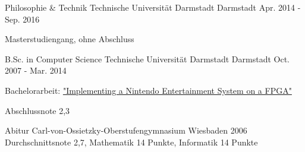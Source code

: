
\begin{cventries}

    \cventry
    {Philosophie \& Technik} %
    {Technische Universität Darmstadt} %
    {Darmstadt} %
    {Apr. 2014 - Sep. 2016} %
    {
      \begin{cvitems} %
        \item {Masterstudiengang, ohne Abschluss}
      \end{cvitems}
    }


  \cventry
    {B.Sc. in Computer Science} %
    {Technische Universität Darmstadt} %
    {Darmstadt} %
    {Oct. 2007 - Mar. 2014} %
    {
      \begin{cvitems} %
        \item {Bachelorarbeit: 
          \href{https://strfry.org/assets/thesis.pdf}
          {"Implementing a Nintendo Entertainment System on a FPGA"}
        }
        \item {Abschlussnote 2,3}
      \end{cvitems}
    }

   \cventry
    {Abitur}
    {Carl-von-Ossietzky-Oberstufengymnasium}
    {Wiesbaden}
    {2006}
    {
        Durchschnittsnote 2,7, Mathematik 14 Punkte, Informatik 14 Punkte
    }

    
\end{cventries}
